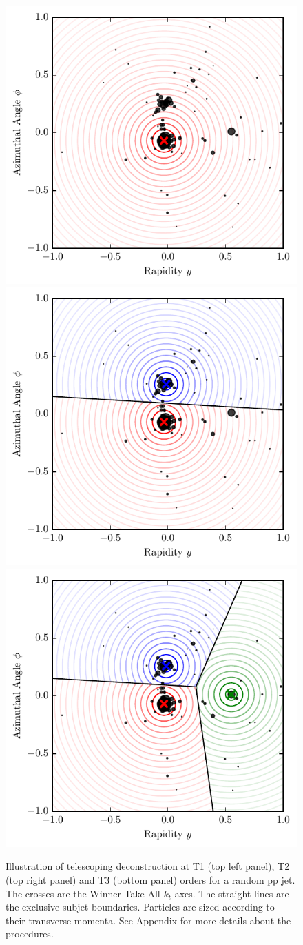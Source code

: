 \documentclass[notoc,preprintnumbers]{JHEP3}
\begin{document}
\begin{figure}[t]
\centering
\includegraphics[width=.49\columnwidth]{figures/QCDjetT1_telescoped2.pdf}
\includegraphics[width=.49\columnwidth]{figures/QCDjetT2_telescoped2.pdf}
\includegraphics[width=.49\columnwidth]{figures/QCDjetT3_telescoped2.pdf}
\caption{Illustration of telescoping deconstruction at T1 (top left panel), T2 (top right panel) and T3 (bottom panel) orders for a random pp jet. The crosses are the Winner-Take-All $k_t$ axes. The straight lines are the exclusive subjet boundaries. Particles are sized according to their transverse momenta. See Appendix for more details about the procedures.}
\label{fig:tjetQCD}
\end{figure}
\end{document}

